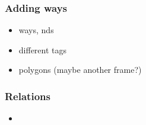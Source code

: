 \documentclass{beamer}
\begin{document}
\begin{frame}
  \frametitle{Adding ways}
  \begin{itemize}
  \item ways, nds
  \item different tags
  \item polygons (maybe another frame?)
  \end{itemize}
\end{frame}


\begin{frame}
  \frametitle{Relations}
  \begin{itemize}
  \item
  \end{itemize}
\end{frame}











\end{document}
